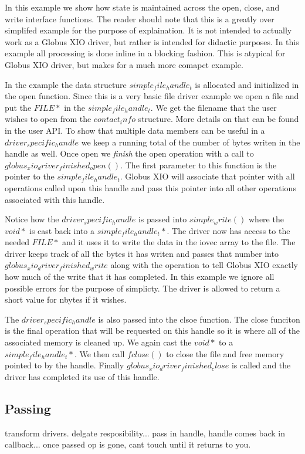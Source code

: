 \documentclass[11pt]{article}
\begin{document}
In this example we show how state is maintained across the open, close,
and write interface functions.  The reader should note that this is
a greatly over simplifed example for the purpose of explaination.  It is
not intended to actually work as a Globus XIO driver, but rather is intended
for didactic purposes.  In this example all processing is done inline in a
blocking fashion.  This is atypical for Globus XIO driver, but makes for
a much more comapct example.

In the example the data structure $simple_file_handle_t$ is allocated
and initialized in the open function.  Since this is a very basic file
driver example we open a file and put the $FILE *$ in the 
$simple_file_handle_t$.  We get the filename that the user wishes to
open from the $contact_info$ structure.  More details on that can be found
in the user API.
To show that multiple data members can be useful in a $driver_specific_handle$
we keep a running total of the number of bytes writen in the handle as well.
Once open we \emph{finish} the open operation with a call to
$globus_xio_driver_finished_open()$.  The first parameter to this function
is the pointer to the $simple_file_handle_t$.  Globus XIO will associate
that pointer with all operations called upon this handle and pass this 
pointer into all other operations associated with this handle.

Notice how the $driver_specific_handle$ is passed into $simple_write()$
where the $void *$ is cast back into a $simple_file_handle_t *$.  The
driver now has access to the needed $FILE *$ and it uses it to write the 
data in the iovec array to the file.  The driver keeps track of all
the bytes it has writen and passes that number into 
$globus_xio_driver_finished_write$ along with the operation to 
tell Globus XIO exactly how much of the write that it has completed.  
In this example we ignore all possible errors for the purpose of simplicty.
The driver is allowed to return a short value for nbytes if it wishes.

The $driver_specific_handle$ is also passed into the clsoe function.
The close funciton is the final operation that will be requested on this 
handle so it is where all of the associated memory is cleaned up.  We
again cast the $void *$ to a $simple_file_handle_t *$.  We then call 
$fclose()$ to close the file and free memory pointed to by the handle.
Finally $globus_xio_driver_finished_close$ is called and the driver has 
completed its use of this handle.

\subsection{Passing}
transform drivers.  delgate resposibility... pass in handle, handle comes
back in callback...  once passed op is gone, cant touch until it returns
to you.
\end{document}
